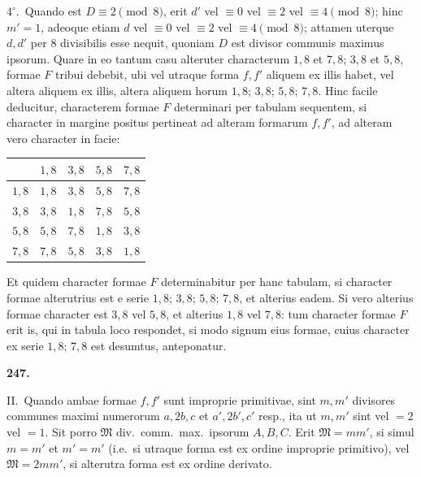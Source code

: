 \documentclass[12pt,a4paper]{article}
\theoremstyle{plain}
\theoremstyle{definition}
\theoremstyle{remark}
\begin{document}
$4^{\circ}$.\ Quando est $D \equiv 2 \pmod{8}$, erit $d'$ vel $\equiv 0$ vel $\equiv 2$ vel $\equiv 4 \pmod{8}$; hinc $m' = 1$, adeoque etiam $d$ vel $\equiv 0$ vel $\equiv 2$ vel $\equiv 4 \pmod{8}$; attamen uterque $d, d'$ per $8$ divisibilis esse nequit, quoniam $D$ est divisor communis maximus ipsorum. Quare in eo tantum casu alteruter characterum $1,8$ et $7,8$; $3,8$ et $5,8$, formae $F$ tribui debebit, ubi vel utraque forma $f, f'$ aliquem ex illis habet, vel altera aliquem ex illis, altera aliquem horum $1,8$; $3,8$; $5,8$; $7,8$. Hinc facile deducitur, characterem formae $F$ determinari per tabulam sequentem, si character in margine positus pertineat ad alteram formarum $f, f'$, ad alteram vero character in facie:

\begin{center}
\begin{tabular}{c|cccc}
& $1,8$ & $3,8$ & $5,8$ & $7,8$ \\
\hline
$1,8$ & $1,8$ & $3,8$ & $5,8$ & $7,8$ \\
$3,8$ & $3,8$ & $1,8$ & $7,8$ & $5,8$ \\
$5,8$ & $5,8$ & $7,8$ & $1,8$ & $3,8$ \\
$7,8$ & $7,8$ & $5,8$ & $3,8$ & $1,8$ \\
\end{tabular}
\end{center}

Et quidem character formae $F$ determinabitur per hanc tabulam, si character formae alterutrius est e serie $1,8$; $3,8$; $5,8$; $7,8$, et alterius eadem. Si vero alterius formae character est $3,8$ vel $5,8$, et alterius $1,8$ vel $7,8$: tum character formae $F$ erit is, qui in tabula loco respondet, si modo signum eius formae, cuius character ex serie $1,8$; $7,8$ est desumtus, anteponatur.

\begin{center}\textbf{247.}\end{center}

II.\ Quando ambae formae $f, f'$ sunt improprie primitivae, sint $m, m'$ divisores communes maximi numerorum $a, 2b, c$ et $a', 2b', c'$ resp., ita ut $m, m'$ sint vel $= 2$ vel $= 1$. Sit porro $\mathfrak{M}$ div.\ comm.\ max.\ ipsorum $A, B, C$. Erit $\mathfrak{M} = mm'$, si simul $m = m'$ et $m' = m'$ (i.e.\ si utraque forma est ex ordine improprie primitivo), vel $\mathfrak{M} = 2mm'$, si alterutra forma est ex ordine derivato.
\end{document}
